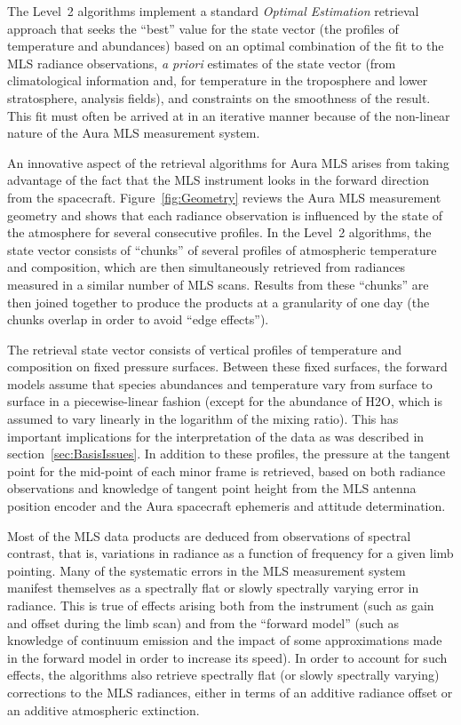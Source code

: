 \documentclass[11pt,draft]{report}
\begin{document}
The Level~2 algorithms implement a standard \emph{Optimal Estimation}
retrieval approach \citep{Rodgers76,Rodgers00} that seeks the ``best''
value for the state vector (the profiles of temperature and abundances)
based on an optimal combination of the fit to the MLS radiance
observations, \emph{a priori} estimates of the state vector (from
climatological information and, for temperature in the troposphere and
lower stratosphere, analysis fields), and constraints on the smoothness
of the result.  This fit must often be arrived at in an iterative manner
because of the non-linear nature of the Aura MLS measurement system.

An innovative aspect of the retrieval algorithms for Aura MLS arises from
taking advantage of the fact that the MLS instrument looks in the
forward direction from the spacecraft.  Figure~\ref{fig:Geometry}
reviews the Aura MLS measurement geometry and shows that each radiance
observation is influenced by the state of the atmosphere for several
consecutive profiles.  In the \thisv Level~2 algorithms, the state vector
consists of ``chunks'' of several profiles of atmospheric temperature and
composition, which are then simultaneously retrieved from radiances
measured in a similar number of MLS scans.  Results from these ``chunks''
are then joined together to produce the products at a granularity of one
day (the chunks overlap in order to avoid ``edge effects'').

The retrieval state vector consists of vertical profiles of temperature
and composition on fixed pressure surfaces.  Between these fixed
surfaces, the forward models assume that species abundances and
temperature vary from surface to surface in a piecewise-linear fashion
(except for the abundance of H\cs2O, which is assumed to vary linearly in
the logarithm of the mixing ratio).  This has important implications for
the interpretation of the data as was described in
section~\ref{sec:BasisIssues}.  In addition to these profiles, the
pressure at the tangent point for the mid-point of each minor frame is
retrieved, based on both radiance observations and knowledge of tangent
point height from the MLS antenna position encoder and the Aura
spacecraft ephemeris and attitude determination.

Most of the MLS data products are deduced from observations of spectral
contrast, that is, variations in radiance as a function of frequency for
a given limb pointing.  Many of the systematic errors in the MLS
measurement system manifest themselves as a spectrally flat or slowly
spectrally varying error in radiance.  This is true of effects arising
both from the instrument (such as gain and offset during the limb scan)
and from the ``forward model'' (such as knowledge of continuum emission
and the impact of some approximations made in the forward model in order
to increase its speed).  In order to account for such effects, the
\thisv algorithms also retrieve spectrally flat (or slowly spectrally
varying) corrections to the MLS radiances, either in terms of an
additive radiance offset or an additive atmospheric extinction.
\end{document}
